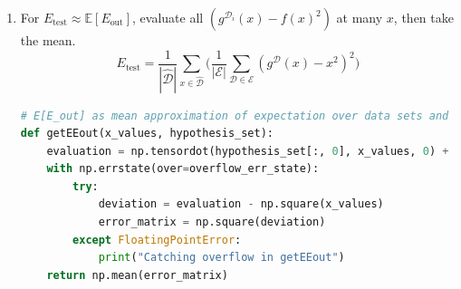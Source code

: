 \documentclass[12pt]{article}
\newcommand{\Data}{\mathcal{D}}
\newcommand{\Exmt}{\mathcal{E}}
\newcommand{\Expect}{\mathbb{E}}
\newcommand{\ErrOut}{E_{\text{out}}}
\newcommand{\ApxErrOut}{E_{\text{test}}}
\begin{document}
\begin{enumerate}
\begin{enumerate}
        \item For $\ApxErrOut \approx \Expect[\ErrOut]$, evaluate all $(g^{\Data_{i}}(x)-f(x)^{2})$ at many $x$, then take the mean.
        \begin{equation*}
            \ApxErrOut = 
            \frac{1}{|\widehat{\Data}|}
            \sum_{x \in \widehat{\Data}}
            \Biggl(
                \frac{1}{\mathcal{|E|}}
                \sum_{\Data \in \Exmt}
                        (g^{\Data}(x) - x^{2})^{2}
            \Biggr)
        \end{equation*}
                
\begin{lstlisting}[language=Python, caption=Finding $\ApxErrOut$]
# E[E_out] as mean approximation of expectation over data sets and test data
def getEEout(x_values, hypothesis_set):
    evaluation = np.tensordot(hypothesis_set[:, 0], x_values, 0) + hypothesis_set[:, 1:]
    with np.errstate(over=overflow_err_state):
        try:
            deviation = evaluation - np.square(x_values)
            error_matrix = np.square(deviation)
        except FloatingPointError:
            print("Catching overflow in getEEout")
    return np.mean(error_matrix)
\end{lstlisting}


\end{enumerate}
\end{enumerate}
\end{document}
